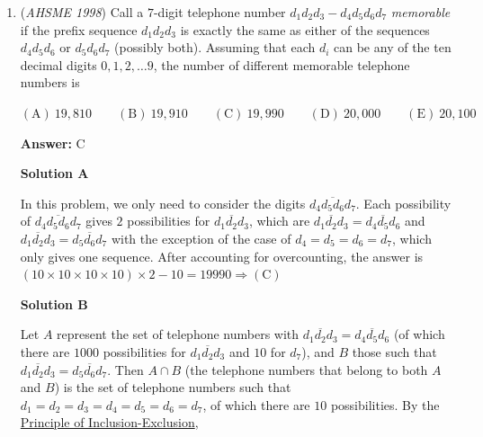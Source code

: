 \begin{enumerate}
\textbf{Solution}

Both sets of points are quite obviously circles. To show this, we can rewrite each of them in the form $(x-x_0)^2 + (y-y_0)^2 = r^2$.

 The first curve becomes $(x-6)^2 + (y-3)^2 = 7^2$, which is a circle centered at $(6,3)$ with radius $7$.

 The second curve becomes $(x-2)^2 + (y-6)^2 = 40+k$, which is a circle centered at $(2,6)$ with radius $r=\sqrt{40+k}$.

 The distance between the two centers is $5$, and therefore the two circles intersect if $2\leq r \leq 12$.

 From $\sqrt{40+k} \geq 2$ we get that $k\geq -36$. From $\sqrt{40+k}\leq 12$ we get $k\leq 104$. 

 Therefore $b-a = 104 - (-36) = \boxed{140}$.

 


	\item (\textit{AHSME 1998}) Call a $7$-digit telephone number $d_1d_2d_3-d_4d_5d_6d_7$ \textit{memorable} if the prefix sequence $d_1d_2d_3$ is exactly the same as either of the sequences $d_4d_5d_6$ or $d_5d_6d_7$ (possibly both). Assuming that each $d_i$ can be any of the ten decimal digits $0,1,2, \ldots 9$, the number of different memorable telephone numbers is 


 $\mathrm{(A) \ } 19,810 \qquad \mathrm{(B) \ } 19,910 \qquad \mathrm{(C) \ } 19,990 \qquad \mathrm{(D) \ } 20,000 \qquad \mathrm{(E) \ } 20,100$

 \textbf{Answer: }C



\textbf{Solution A}

In this problem, we only need to consider the digits $\overline{d_4d_5d_6d_7}$. Each possibility of $\overline{d_4d_5d_6d_7}$ gives $2$ possibilities for $\overline{d_1d_2d_3}$, which are $\overline{d_1d_2d_3}=\overline{d_4d_5d_6}$ and $\overline{d_1d_2d_3}=\overline{d_5d_6d_7}$ with the exception of the case of $d_4=d_5=d_6=d_7$, which only gives one sequence. After accounting for overcounting, the answer is $(10 \times 10 \times 10 \times 10) \times 2 - 10=19990 \Rightarrow \boxed{\mathrm{(C)}}$




\textbf{Solution B}

Let $A$ represent the set of telephone numbers with $\overline{d_1d_2d_3} = \overline{d_4d_5d_6}$ (of which there are $1000$ possibilities for $\overline{d_1d_2d_3}$ and $10$ for $d_7$), and $B$ those such that $\overline{d_1d_2d_3} = \overline{d_5d_6d_7}$. Then $A \cap B$ (the telephone numbers that belong to both $A$ and $B$) is the set of telephone numbers such that $d_1 = d_2 = d_3 = d_4 = d_5 = d_6 = d_7$, of which there are $10$ possibilities. By the \href{https://artofproblemsolving.com/wiki/index.php?title=Principle\_of\_Inclusion-Exclusion}{Principle of Inclusion-Exclusion},


\end{enumerate}
